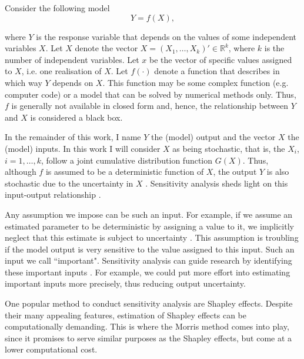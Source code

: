 
\noindent Consider the following model
\begin{equation*}
Y = f(X),
\end{equation*}

where $Y$ is the response variable that depends on the values of some independent variables $X$. Let $X$ denote the vector $X = (X_1, \dots, X_k)' \in \mathbb{R}^k$, where $k$ is the number of independent variables. Let $x$ be the vector of specific values assigned to $X$, i.e. one realisation of $X$. Let $f(\cdot)$ denote a function that describes in which way $Y$ depends on $X$. This function may be some complex function (e.g. computer code) or a model that can be solved by numerical methods only. Thus, $f$ is generally not available in closed form and, hence, the relationship between $Y$ and $X$ is considered a black box.

In the remainder of this work, I name $Y$ the (model) output and the vector $X$ the (model) inputs. In this work I will consider $X$ as being stochastic, that is, the $X_i$, $i = 1,\dots, k$, follow a joint cumulative distribution function $G(X)$. Thus, although $f$ is assumed to be a deterministic function of $X$, the output $Y$ is also stochastic due to the uncertainty in $X$ \citep{SNS16}. Sensitivity analysis sheds light on this input-output relationship \citep{BP16}.

Any assumption we impose can be such an input. For example, if we assume an estimated parameter to be deterministic by assigning a value to it, we implicitly neglect that this estimate is subject to uncertainty \citep{R21}. This assumption is troubling if the model output is very sensitive to the value assigned to this input. Such an input we call ``important". Sensitivity analysis can guide research by identifying these important inputs \citep{R21}. For example, we could put more effort into estimating important inputs more precisely, thus reducing output uncertainty.


One popular method to conduct sensitivity analysis are Shapley effects. Despite their many appealing features, estimation of Shapley effects can be computationally demanding. This is where the Morris method comes into play, since it promises to serve similar purposes as the Shapley effects, but come at a lower computational cost.


